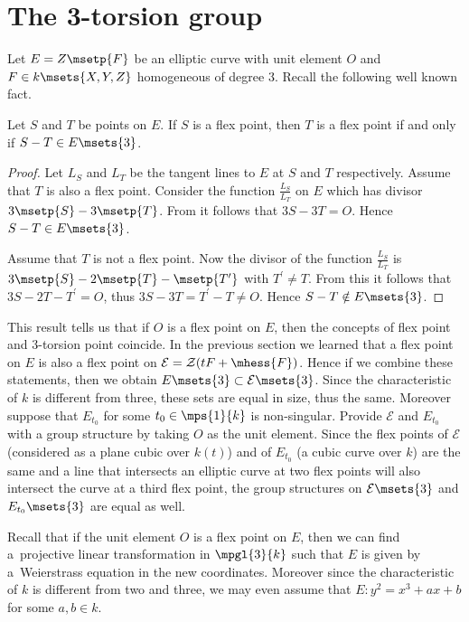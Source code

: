 \section{The 3-torsion group}\label{hpga:sec:3tgrp}

Let $E=Z\msetp{F}$ be an elliptic curve with unit element $O$ and $F\in k\msets {X,Y,Z}$ homogeneous of degree 3. Recall the following well known fact.

\begin{Proposition}Let $S$ and $T$ be points on $E$. If $S$ is a flex point, then $T$ is a flex point if and only if $S-T\in E\msets{3}$.
\end{Proposition}
\begin{proof}Let $L_S$ and $L_T$ be the tangent lines to $E$ at $S$ and $T$ respectively. Assume that $T$ is also a flex point. Consider the function $\frac{L_S}{L_T}$ on $E$ which has divisor $3\msetp{S}-3\msetp{T}$. From \cite[Corollary~III.3.5]{silverman1985} it follows that $3S-3T=O$. Hence $S-T\in E\msets{3}$.

Assume that $T$ is not a flex point. Now the divisor of the function $\frac {L_S}{L_T}$ is $3\msetp{S}-2\msetp{T}-\msetp{T^\prime}$ with $T^\prime\neq T$. From this it follows that $3S-2T-T^\prime=O$, thus $3S-3T=T^\prime-T\neq O$. Hence $S-T\notin E\msets{3}$.
\end{proof}

This result tells us that if $O$ is a flex point on $E$, then the concepts of flex point and 3-torsion point coincide. In the previous section we learned that a flex point on $E$ is also a flex point on $\mathcal{E}=\mathcal{Z}(tF+\mhess{F})$. Hence if we combine these statements, then we obtain $E\msets{3}\subset\mathcal{E}\msets{3}$. Since the characteristic of $k$ is different from three, these sets are equal in size, thus the same. Moreover suppose that $E_{t_0}$ for some $t_0\in\mps{1}{k}$ is non-singular. Provide $\mathcal{E}$ and $E_{t_0}$ with a group structure by taking $O$ as the unit element. Since the flex points of $\mathcal{E}$ (considered as a plane cubic over $k(t)$) and of $E_{t_0}$ (a cubic curve over $k$) are the same and a line that intersects an elliptic curve at two flex points will also intersect the curve at a third flex point, the group structures on $\mathcal{E}\msets{3}$ and $E_{t_0}\msets{3}$ are equal as well.

Recall that if the unit element $O$ is a flex point on $E$, then we can find a~projective linear transformation in $\mpgl{3}{k}$ such that $E$ is given by a~Weierstrass equation in the new coordinates. Moreover since the characteristic of $k$ is different from two and three, we may even assume that $E\colon y^2=x^3+ax+b$ for some $a,b\in k$.

